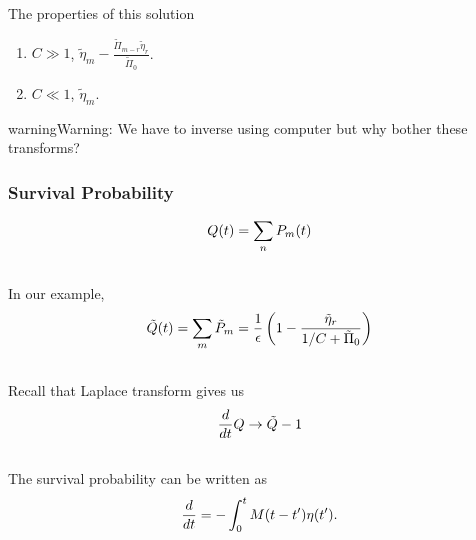 \documentclass[letterpaper,10pt,english]{sphinxmanual}
\begin{document}
The properties of this solution
\begin{enumerate}
\item {} 
$C\gg 1$, $\tilde \eta_m - \frac{\tilde \Pi_{m-r} \tilde \eta_r}{\tilde \Pi_0}$.

\item {} 
$C\ll 1$, $\tilde \eta_m$.

\end{enumerate}

\begin{notice}{warning}{Warning:}
We have to inverse using computer but why bother these transforms?
\end{notice}


\subsubsection{Survival Probability}
\label{nonequilibrium/effectOfDefects:survival-probability}\begin{gather}
\begin{split}Q(t) = \sum_n P_m(t)\end{split}\notag\\\begin{split}\end{split}\notag
\end{gather}
In our example,
\begin{gather}
\begin{split}\tilde Q(t) = \sum_m \tilde P_m = \frac{1}{\epsilon}\left( 1 - \frac{\tilde \eta_r}{1/C + \tilde \Pi_0} \right)\end{split}\notag\\\begin{split}\end{split}\notag
\end{gather}
Recall that Laplace transform gives us
\begin{gather}
\begin{split}\frac{d}{dt}Q \to \tilde Q - 1\end{split}\notag\\\begin{split}\end{split}\notag
\end{gather}
The survival probability can be written as
\begin{gather}
\begin{split}\frac{d}{dt} = - \int_0^t M(t-t') \eta(t').\end{split}\notag\\\begin{split}\end{split}\notag
\end{gather}
\end{document}
